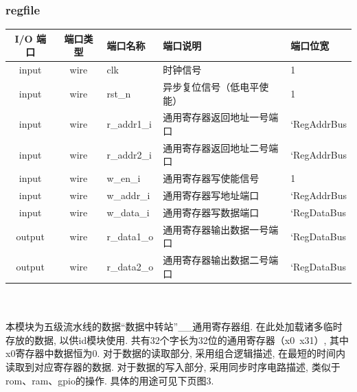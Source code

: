 \documentclass[lang=cn,11pt,a4paper,chinesefont=founder]{elegantpaper}
\begin{document}
\subsubsection{regfile}
\begin{tabular}{cclll}
    \toprule
    I/O 端口 & 端口类型 & 端口名称    & 端口说明                   & 端口位宽    \\
    \midrule
    input    & wire     & clk         & 时钟信号                   & 1           \\
    input    & wire     & rst\_n      & 异步复位信号（低电平使能） & 1           \\

    input    & wire     & r\_addr1\_i & 通用寄存器返回地址一号端口 & `RegAddrBus \\
    input    & wire     & r\_addr2\_i & 通用寄存器返回地址二号端口 & `RegAddrBus \\
    input    & wire     & w\_en\_i    & 通用寄存器写使能信号       & 1           \\
    input    & wire     & w\_addr\_i  & 通用寄存器写地址端口       & `RegAddrBus \\
    input    & wire     & w\_data\_i  & 通用寄存器写数据端口       & `RegDataBus \\


    output   & wire     & r\_data1\_o & 通用寄存器输出数据一号端口 & `RegDataBus \\
    output   & wire     & r\_data2\_o & 通用寄存器输出数据二号端口 & `RegDataBus \\
    \bottomrule
\end{tabular}\\
\\
本模块为五级流水线的数据“数据中转站”\_\_通用寄存器组. 在此处加载诸多临时存放的数据, 以供id模块使用. 共有32个字长为32位的通用寄存器（x0~x31）, 其中x0寄存器中数据恒为0. 对于数据的读取部分, 采用组合逻辑描述, 在最短的时间内读取到对应寄存器的数据. 对于数据的写入部分, 采用同步时序电路描述, 类似于rom、ram、gpio的操作. 具体的用途可见下页图3. 
\end{document}
